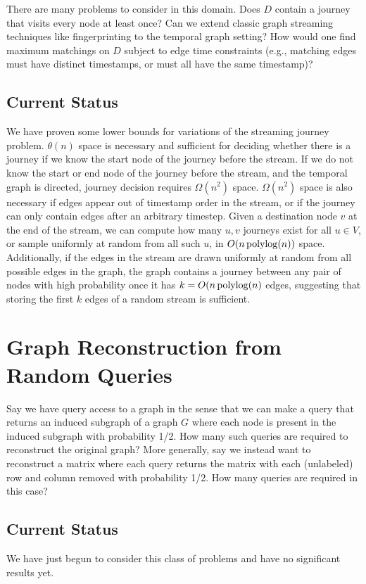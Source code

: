 There are many problems to consider in this domain. Does $D$ contain a journey that visits every node at least once?  Can we extend classic graph streaming techniques like fingerprinting to the temporal graph setting?  How would one find maximum matchings on $D$ subject to edge time constraints (e.g., matching edges must have distinct timestamps, or must all have the same timestamp)?

\subsection*{Current Status}
We have proven some lower bounds for variations of the streaming journey problem.  $\theta(n)$ space is necessary and sufficient for deciding whether there is a journey if we know the start node of the journey before the stream.  If we do not know the start or end node of the journey before the stream, and the temporal graph is directed, journey decision requires $\Omega(n^2)$ space.  $\Omega(n^2)$ space is also necessary if edges appear out of timestamp order in the stream, or if the journey can only contain edges after an arbitrary timestep. Given a destination node $v$ at the end of the stream, we can compute how many $u,v$ journeys exist for all $u \in V$, or sample uniformly at random from all such $u$, in $O(n \operatorname{polylog}(n))$ space.  Additionally, if the edges in the stream are drawn uniformly at random from all possible edges in the graph, the graph contains a journey between any pair of nodes with high probability once it has $k = O(n \operatorname{polylog}(n)$ edges, suggesting that storing the first $k$ edges of a random stream is sufficient.

\section{Graph Reconstruction from Random Queries}
\label{sec:recon}

Say we have query access to a graph in the sense that we can make a query that returns an induced subgraph of a graph $G$ where each node is present in the induced subgraph with probability 1/2. How many such queries are required to reconstruct the original graph? More generally, say we instead want to reconstruct a matrix where each query returns the matrix with each (unlabeled) row and column removed with probability 1/2. How many queries are required in this case?

\subsection*{Current Status}
We have just begun to consider this class of problems and have no significant results yet.